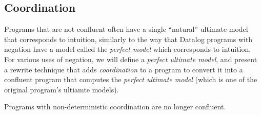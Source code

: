 
\subsection{Coordination}
Programs that are not confluent often have a single ``natural'' ultimate model that corresponds to intuition, similarly to the way that Datalog programs with negation have a model called the {\em perfect model} which corresponds to intuition.  For various uses of negation, we will define a {\em perfect ultimate model}, and present a rewrite technique that adds {\em coordination} to a \lang program to convert it into a confluent \lang program that computes the {\em perfect ultimate model} (which is one of the original program's ultiamte models).




Programs with non-deterministic coordination are no longer confluent.
